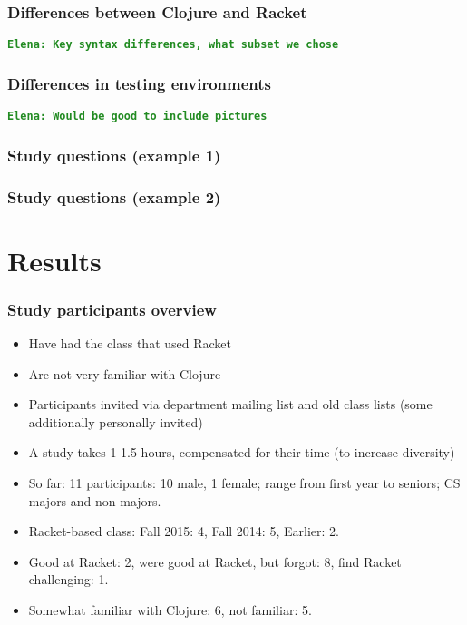 \documentclass{beamer}
\newcommand{\comment}[1]{{\bf \tt  {#1}}}
\newcommand{\emcomment}[1]{\textcolor{ForestGreen}{\comment{Elena: {#1}}}}
\begin{document}
\begin{frame}
\frametitle{ Differences between Clojure and Racket}
\emcomment{Key syntax differences, what subset we chose}
\end{frame}

\begin{frame}
\frametitle{ Differences in testing environments}
\emcomment{Would be good to include pictures}
\end{frame}

\begin{frame}
\frametitle{Study questions (example 1)}

\end{frame}

\begin{frame}
\frametitle{Study questions (example 2)}

\end{frame}

\section{Results}

\begin{frame}
\frametitle{Study participants overview}
\begin{itemize}
\item Have had the class that used Racket
\item Are not very familiar with Clojure 
\item Participants invited via department mailing list and old class lists (some additionally personally invited)
\item A study takes 1-1.5 hours, compensated for their time (to increase diversity)
\item So far: 11 participants: 10 male, 1 female; range from first year to seniors; CS majors and non-majors.  
\item Racket-based class: Fall 2015: 4, Fall 2014: 5, Earlier: 2. 
\item Good at Racket: 2, were good at Racket, but forgot: 8, find Racket challenging: 1.
\item Somewhat familiar with Clojure: 6, not familiar: 5.  
\end{itemize}
\end{frame}
\end{document}
